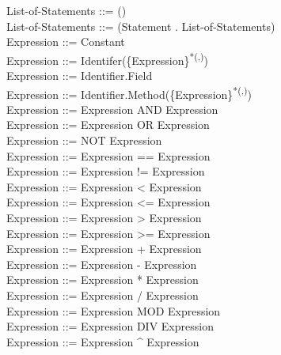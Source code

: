 \documentclass{article}
\begin{document}
\noindent
List-of-Statements ::= ()\\
List-of-Statements ::= (Statement . List-of-Statements)\\

\noindent
Expression ::= Constant\\
Expression ::= Identifer(\{Expression\}\textsuperscript{*(,)})\\
Expression ::= Identifier.Field\\
Expression ::= Identifier.Method(\{Expression\}\textsuperscript{*(,)})\\

\noindent
Expression ::= Expression AND Expression\\
Expression ::= Expression OR Expression\\
Expression ::= NOT Expression\\

\noindent
Expression ::= Expression == Expression\\
Expression ::= Expression != Expression\\
Expression ::= Expression \textless{} Expression\\
Expression ::= Expression \textless= Expression\\
Expression ::= Expression \textgreater{} Expression\\
Expression ::= Expression \textgreater= Expression\\

\noindent
Expression ::= Expression + Expression\\
Expression ::= Expression - Expression\\
Expression ::= Expression * Expression\\
Expression ::= Expression / Expression\\
Expression ::= Expression MOD Expression\\
Expression ::= Expression DIV Expression\\
Expression ::= Expression \textasciicircum{} Expression\\

\printbibliography[heading=bibintoc]
\end{document}
